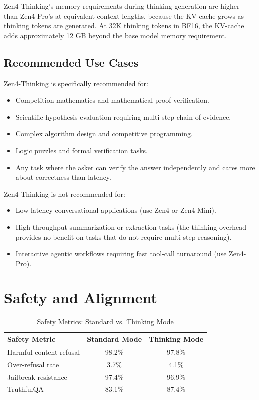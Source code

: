 \documentclass[11pt,a4paper]{article}
\begin{document}
Zen4-Thinking's memory requirements during thinking generation are higher than
Zen4-Pro's at equivalent context lengths, because the KV-cache grows as thinking
tokens are generated. At 32K thinking tokens in BF16, the KV-cache adds approximately
12 GB beyond the base model memory requirement.

\subsection{Recommended Use Cases}

Zen4-Thinking is specifically recommended for:

\begin{itemize}
    \item Competition mathematics and mathematical proof verification.
    \item Scientific hypothesis evaluation requiring multi-step chain of evidence.
    \item Complex algorithm design and competitive programming.
    \item Logic puzzles and formal verification tasks.
    \item Any task where the asker can verify the answer independently and cares
    more about correctness than latency.
\end{itemize}

Zen4-Thinking is not recommended for:

\begin{itemize}
    \item Low-latency conversational applications (use Zen4 or Zen4-Mini).
    \item High-throughput summarization or extraction tasks (the thinking overhead
    provides no benefit on tasks that do not require multi-step reasoning).
    \item Interactive agentic workflows requiring fast tool-call turnaround (use Zen4-Pro).
\end{itemize}

\section{Safety and Alignment}

\begin{table}[H]
\centering
\begin{tabular}{lcc}
\toprule
\textbf{Safety Metric} & \textbf{Standard Mode} & \textbf{Thinking Mode} \\
\midrule
Harmful content refusal        & 98.2\% & 97.8\% \\
Over-refusal rate              & 3.7\%  & 4.1\%  \\
Jailbreak resistance           & 97.4\% & 96.9\% \\
TruthfulQA                     & 83.1\% & 87.4\% \\
\bottomrule
\end{tabular}
\caption{Safety Metrics: Standard vs. Thinking Mode}
\end{table}
\end{document}
